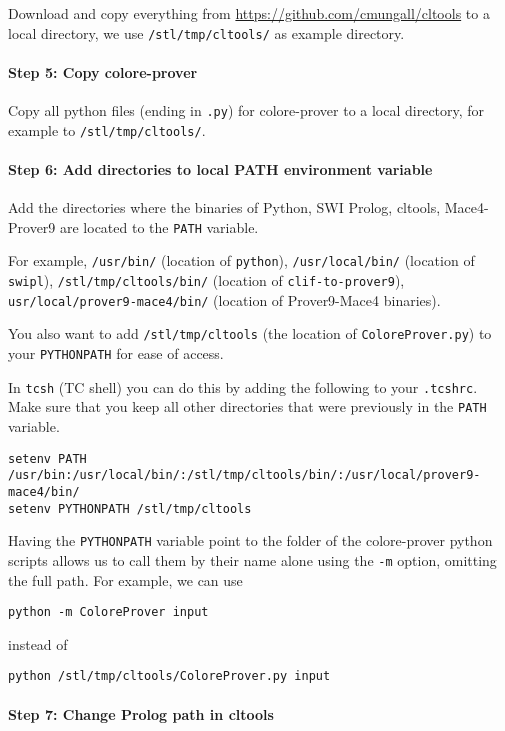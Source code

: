 \documentclass{article}
\begin{document}
Download and copy everything from \url{https://github.com/cmungall/cltools} to a local directory, we use \texttt{/stl/tmp/cltools/} as example directory.

\paragraph{Step 5: Copy colore-prover}
Copy all python files (ending in \texttt{.py}) for colore-prover to a local directory, for example to \texttt{/stl/tmp/cltools/}.

\paragraph{Step 6: Add directories to local PATH environment variable}

Add the directories where the binaries of Python, SWI Prolog, cltools, Mace4-Prover9 are located to the \texttt{PATH} variable.
 
For example, \texttt{/usr/bin/} (location of \texttt{python}), \texttt{/usr/local/bin/} (location of \texttt{swipl}), \texttt{/stl/tmp/cltools/bin/} (location of \texttt{clif-to-prover9}), \texttt{usr/local/prover9-mace4/bin/} (location of Prover9-Mace4 binaries).

You also want to add \texttt{/stl/tmp/cltools} (the location of \texttt{ColoreProver.py}) to your \texttt{PYTHONPATH} for ease of access. 

In \texttt{tcsh} (TC shell) you can do this by adding the following to your \texttt{.tcshrc}.  Make sure that you keep all other directories that were previously in the \texttt{PATH} variable.
\begin{verbatim}
setenv PATH /usr/bin:/usr/local/bin/:/stl/tmp/cltools/bin/:/usr/local/prover9-mace4/bin/
setenv PYTHONPATH /stl/tmp/cltools
\end{verbatim}

Having the \texttt{PYTHONPATH} variable point to the folder of the colore-prover python scripts allows us to call them by their name alone using the \texttt{-m} option, omitting the full path. For example, we can use
\begin{verbatim}
python -m ColoreProver input
\end{verbatim}
instead of
\begin{verbatim}
python /stl/tmp/cltools/ColoreProver.py input
\end{verbatim}

\paragraph{Step 7: Change Prolog path in cltools}
\end{document}
